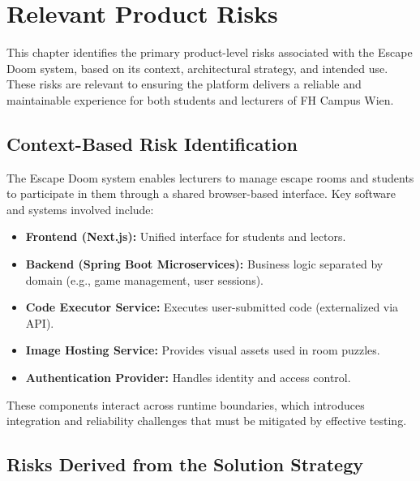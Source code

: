 \section{Relevant Product Risks}\label{sec:relevant-product-risks}

This chapter identifies the primary product-level risks associated with the Escape Doom system, based on its context, architectural strategy, and intended use. These risks are relevant to ensuring the platform delivers a reliable and maintainable experience for both students and lecturers of FH Campus Wien.

\subsection*{Context-Based Risk Identification}

The Escape Doom system enables lecturers to manage escape rooms and students to participate in them through a shared browser-based interface. Key software and systems involved include:

\begin{itemize}
    \item \textbf{Frontend (Next.js):} Unified interface for students and lectors.
    \item \textbf{Backend (Spring Boot Microservices):} Business logic separated by domain (e.g., game management, user sessions).
    \item \textbf{Code Executor Service:} Executes user-submitted code (externalized via API).
    \item \textbf{Image Hosting Service:} Provides visual assets used in room puzzles.
    \item \textbf{Authentication Provider:} Handles identity and access control.
\end{itemize}

These components interact across runtime boundaries, which introduces integration and reliability challenges that must be mitigated by effective testing.

\subsection*{Risks Derived from the Solution Strategy}

